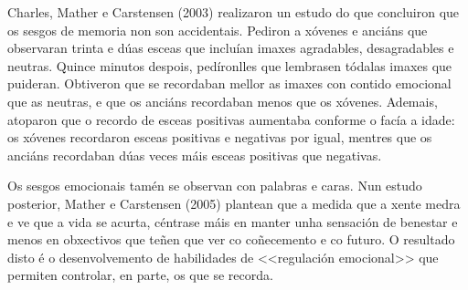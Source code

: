 \documentclass[a4paper,11pt]{article}
\begin{document}
Charles, Mather e Carstensen (2003) realizaron un estudo do que concluiron que os sesgos de memoria non son accidentais. Pediron a xóvenes e anciáns que observaran trinta e dúas esceas que incluían imaxes agradables, desagradables e neutras. Quince minutos despois, pedíronlles que lembrasen tódalas imaxes que puideran. Obtiveron que se recordaban mellor as imaxes con contido emocional que as neutras, e que os anciáns recordaban menos que os xóvenes. Ademais, atoparon que o recordo de esceas positivas aumentaba conforme o facía a idade: os xóvenes recordaron esceas positivas e negativas por igual, mentres que os anciáns recordaban dúas veces máis esceas positivas que negativas. 

Os sesgos emocionais tamén se observan con palabras e caras. Nun estudo posterior, Mather e Carstensen (2005) plantean que a medida que a xente medra e ve que a vida se acurta, céntrase máis en manter unha sensación de benestar e menos en obxectivos que teñen que ver co coñecemento e co futuro. O resultado disto é o desenvolvemento de habilidades de <<regulación emocional>> que permiten controlar, en parte, os que se recorda.
\end{document}
